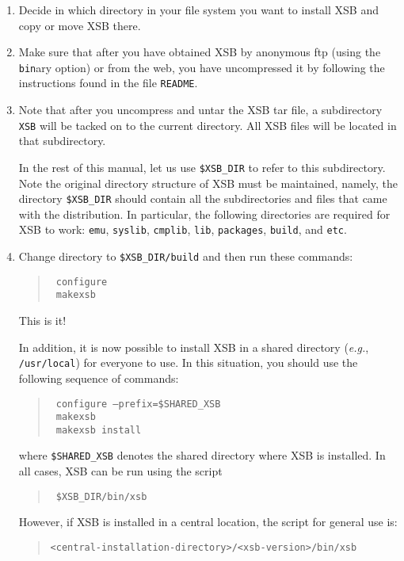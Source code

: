 \begin{enumerate}
\item	Decide in which directory in your file system you want to install
  XSB and copy or move XSB there.
\item Make sure that after you have obtained XSB by anonymous ftp (using
  the {\tt bin}ary option) or from the web, you have uncompressed it by
  following the instructions found in the file {\tt README}.
  
\item Note that after you uncompress and untar the XSB tar file, a
  subdirectory {\tt XSB} will be tacked on to the current directory. All
  XSB files will be located in that subdirectory.
  
  In the rest of this manual, let us use {\tt \$XSB\_DIR} to refer to this
  subdirectory.  Note the original directory structure of XSB must be
  maintained, namely, the directory {\tt \$XSB\_DIR} should contain all the
  subdirectories and files that came with the distribution. In particular,
  the following directories are required for XSB to work: \verb'emu',
  \verb'syslib', \verb'cmplib', \verb'lib', \verb'packages', \verb'build',
  and \verb'etc'.


\item Change directory to {\tt \$XSB\_DIR/build} and then run these commands:
  \begin{quote}
    \tt
    configure\\
    \tt
    makexsb
  \end{quote}
  This is it!
  
  In addition, it is now possible to install XSB in a shared directory
  ({\it e.g.}, {\tt /usr/local}) for everyone to use.  In this situation,
  you should use the following sequence of commands:
  \begin{quote}
    \tt
    configure --prefix=\$SHARED\_XSB\\
    \tt
    makexsb\\
    \tt
    makexsb install
  \end{quote}
  where {\tt \$SHARED\_XSB}  denotes the shared directory where XSB is
  installed.  In all cases, XSB can be run using the script
  \begin{quote}
    \tt
    \$XSB\_DIR/bin/xsb
  \end{quote}
  However, if XSB is installed in a central location, the script for
  general use is:
  \begin{quote}
    \verb'<central-installation-directory>/<xsb-version>/bin/xsb'
  \end{quote}
\end{enumerate}

